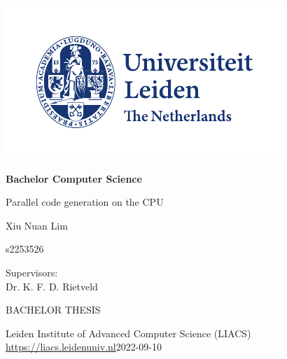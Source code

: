 \thispagestyle{empty}

\includegraphics{UL_Algemeen internationaal_CMYK}

\vspace{-2cm}\hfill \begin{LARGE}\textbf{Bachelor Computer Science}\end{LARGE}

\vspace{3.5cm}
\begin{Large}
\hfill Parallel code generation on the CPU

\vspace{2.0cm}

\hfill Xiu Nuan Lim

\vspace{0.33cm}

\hfill s2253526
\end{Large}

\vspace{5.0cm}

\begin{large}

Supervisors:\\
Dr. K. F. D. Rietveld


\vspace{2.0cm}
BACHELOR THESIS

\vspace{5mm}
Leiden Institute of Advanced Computer Science (LIACS)\\
\url{https://liacs.leidenuniv.nl}\hfill 2022-09-10
\end{large}

\newpage

